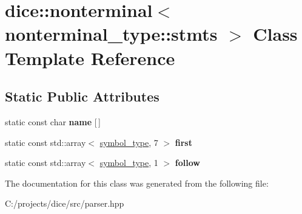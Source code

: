 \hypertarget{classdice_1_1nonterminal_3_01nonterminal__type_1_1stmts_01_4}{}\section{dice\+:\+:nonterminal$<$ nonterminal\+\_\+type\+:\+:stmts $>$ Class Template Reference}
\label{classdice_1_1nonterminal_3_01nonterminal__type_1_1stmts_01_4}
\subsection*{Static Public Attributes}
\begin{DoxyCompactItemize}
\item 
\mbox{\label{classdice_1_1nonterminal_3_01nonterminal__type_1_1stmts_01_4_aad94bdf80aaead384b8ca5f77e664e63}} 
static const char {\bfseries name} \mbox{[}$\,$\mbox{]}
\item 
\mbox{\label{classdice_1_1nonterminal_3_01nonterminal__type_1_1stmts_01_4_adba6a09bc0831f44300d70cba3c70f7a}} 
static const std\+::array$<$ \mbox{\hyperlink{symbols_8hpp_ab0295a855bb7eadc138abd6993af3aea}{symbol\+\_\+type}}, 7 $>$ {\bfseries first}
\item 
\mbox{\label{classdice_1_1nonterminal_3_01nonterminal__type_1_1stmts_01_4_ab181d697c8e58118cc564aa7c8bb3a33}} 
static const std\+::array$<$ \mbox{\hyperlink{symbols_8hpp_ab0295a855bb7eadc138abd6993af3aea}{symbol\+\_\+type}}, 1 $>$ {\bfseries follow}
\end{DoxyCompactItemize}


The documentation for this class was generated from the following file\+:\begin{DoxyCompactItemize}
\item 
C\+:/projects/dice/src/parser.\+hpp\end{DoxyCompactItemize}
